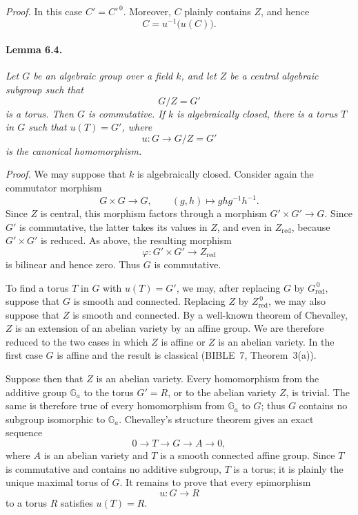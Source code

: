 \emph{Proof.}
In this case \(C'=C'^{\,0}\). Moreover, \(C\) plainly contains
\(Z\), and hence
\[
  C=u^{-1}\bigl(u(C)\bigr).
\]

\paragraph{\textbf{Lemma 6.4.}}
\emph{Let \(G\) be an algebraic group over a field \(k\), and let
\(Z\) be a central algebraic subgroup such that
\[
  G/Z=G'
\]
is a torus. Then \(G\) is commutative. If \(k\) is algebraically
closed, there is a torus \(T\) in \(G\) such that \(u(T)=G'\), where
\[
  u:G\longrightarrow G/Z=G'
\]
is the canonical homomorphism.}

\emph{Proof.}
We may suppose that \(k\) is algebraically closed. Consider again
the commutator morphism
\[
  G\times G\longrightarrow G,\qquad
  (g,h)\longmapsto ghg^{-1}h^{-1}.
\]
Since \(Z\) is central, this morphism factors through a morphism
\(G'\times G'\to G\). Since \(G'\) is commutative, the latter takes
its values in \(Z\), and even in \(Z_{\mathrm{red}}\), because
\(G'\times G'\) is reduced. As above, the resulting morphism
\[
  \varphi:G'\times G'\longrightarrow Z_{\mathrm{red}}
\]
is bilinear and hence zero. Thus \(G\) is commutative.

To find a torus \(T\) in \(G\) with \(u(T)=G'\), we may, after
replacing \(G\) by \(G_{\mathrm{red}}^{\,0}\), suppose that \(G\)
is smooth and connected. Replacing \(Z\) by
\(Z_{\mathrm{red}}^{\,0}\), we may also suppose that \(Z\) is
smooth and connected. By a well-known theorem of
Chevalley, \(Z\) is an extension of an abelian variety by an affine
group. We are therefore reduced to the two cases in which \(Z\) is
affine or \(Z\) is an abelian variety. In the first case \(G\) is
affine and the result is classical \textup{(BIBLE~7, Theorem~3(a))}.

Suppose then that \(Z\) is an abelian variety. Every homomorphism
from the additive group \(\mathbb G_a\) to the torus \(G'=R\), or
to the abelian variety \(Z\), is trivial. The same is therefore true
of every homomorphism from \(\mathbb G_a\) to \(G\); thus \(G\)
contains no subgroup isomorphic to \(\mathbb G_a\). Chevalley's
structure theorem gives an exact sequence
\[
  0\longrightarrow T\longrightarrow G\longrightarrow A
  \longrightarrow 0, \tag{*}\label{sga3:xii:lemma:6-4:equation:star}
\]
where \(A\) is an abelian variety and \(T\) is a smooth connected
affine group. Since \(T\) is commutative and contains no additive
subgroup, \(T\) is a torus; it is plainly the unique maximal torus
of \(G\). It remains to prove that every epimorphism
\[
  u:G\longrightarrow R
\]
to a torus \(R\) satisfies \(u(T)=R\).

